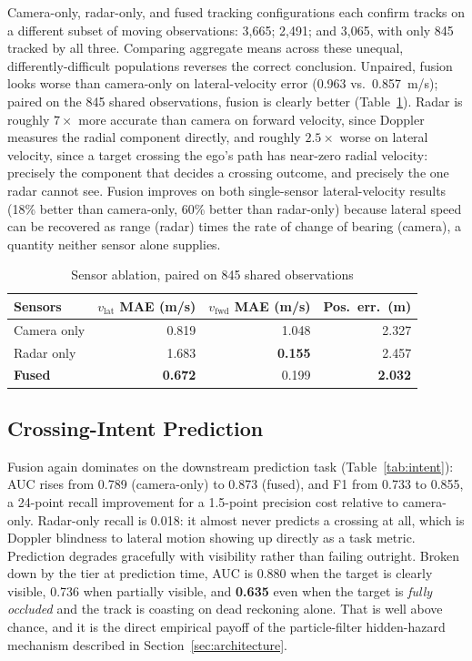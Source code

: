 \documentclass[conference]{IEEEtran}
\begin{document}
Camera-only, radar-only, and fused tracking configurations each confirm
tracks on a different subset of moving observations: 3{,}665; 2{,}491;
and 3{,}065, with only 845 tracked by all three. Comparing aggregate
means across these unequal, differently-difficult populations reverses
the correct conclusion. Unpaired, fusion looks worse than camera-only
on lateral-velocity error (0.963 vs.\ 0.857~m/s); paired on the 845
shared observations, fusion is clearly better (Table~\ref{tab:ablation}).
Radar is roughly $7\times$ more accurate than camera on forward
velocity, since Doppler measures the radial component directly, and
roughly $2.5\times$ worse on lateral velocity, since a target crossing
the ego's path has near-zero radial velocity: precisely the component
that decides a crossing outcome, and precisely the one radar cannot
see. Fusion improves on both single-sensor lateral-velocity results
(18\% better than camera-only, 60\% better than radar-only) because
lateral speed can be recovered as range (radar) times the rate of
change of bearing (camera), a quantity neither sensor alone supplies.

\begin{table}[htbp]
\caption{Sensor ablation, paired on 845 shared observations}
\label{tab:ablation}
\centering
\begin{tabular}{@{}lrrr@{}}
\toprule
Sensors & $v_{\text{lat}}$ MAE (m/s) & $v_{\text{fwd}}$ MAE (m/s) & Pos.\ err.\ (m) \\
\midrule
Camera only & 0.819 & 1.048 & 2.327 \\
Radar only & 1.683 & \textbf{0.155} & 2.457 \\
\textbf{Fused} & \textbf{0.672} & 0.199 & \textbf{2.032} \\
\bottomrule
\end{tabular}
\end{table}

\subsection{Crossing-Intent Prediction}

Fusion again dominates on the downstream prediction task
(Table~\ref{tab:intent}): AUC rises from 0.789 (camera-only) to 0.873
(fused), and F1 from 0.733 to 0.855, a 24-point recall improvement for
a 1.5-point precision cost relative to camera-only. Radar-only recall
is 0.018: it almost never predicts a crossing at all, which is Doppler
blindness to lateral motion showing up directly as a task metric.
Prediction degrades gracefully with visibility rather than failing
outright. Broken down by the tier at prediction time, AUC is 0.880 when
the target is clearly visible, 0.736 when partially visible, and
\textbf{0.635} even when the target is \emph{fully occluded} and the
track is coasting on dead reckoning alone. That is well above chance,
and it is the direct empirical payoff of the particle-filter
hidden-hazard mechanism described in Section~\ref{sec:architecture}.
\end{document}
